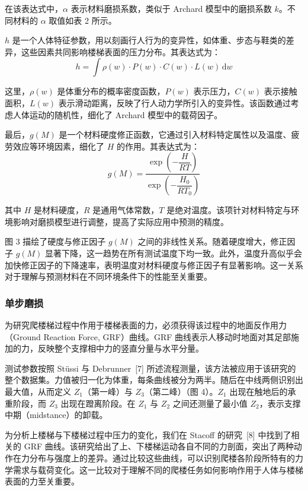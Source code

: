\documentclass[11pt,a4paper]{ctexart}
\begin{document}
在该表达式中，$\alpha$ 表示材料磨损系数，类似于 Archard 模型中的磨损系数 $k$。不同材料的 $\alpha$ 取值如表 2 所示。

$h$ 是一个人体特征参数，用以刻画行人行为的变异性，如体重、步态与鞋类的差异，这些因素共同影响楼梯表面的压力分布。其表达式为：
\begin{equation}
h = \int \rho(w)\cdot P(w)\cdot C(w)\cdot L(w)\,\mathrm{d}w
\end{equation}

这里，$\rho(w)$ 是体重分布的概率密度函数，$P(w)$ 表示压力，$C(w)$ 表示接触面积，$L(w)$ 表示滑动距离，反映了行人动力学所引入的变异性。该函数通过考虑人体运动的随机性，细化了 Archard 模型中的载荷因子。

最后，$g(M)$ 是一个材料硬度修正函数，它通过引入材料特定属性以及温度、疲劳效应等环境因素，细化了 $H$ 的作用。其表达式为：
\begin{equation}
g(M) = \frac{\exp\left(-\dfrac{H}{RT}\right)}{\exp\left(-\dfrac{H_0}{RT_0}\right)}
\end{equation}

其中 $H$ 是材料硬度，$R$ 是通用气体常数，$T$ 是绝对温度。该项针对材料特定与环境影响对磨损模型进行调整，提高了实际应用中预测的精度。

图 3 描绘了硬度与修正因子 $g(M)$ 之间的非线性关系。随着硬度增大，修正因子 $g(M)$ 显著下降，这一趋势在所有测试温度下均一致。此外，温度升高似乎会加快修正因子的下降速率，表明温度对材料硬度与修正因子有显著影响。这一关系对于理解与预测材料在不同环境条件下的性能至关重要。

\subsubsection{单步磨损}

为研究爬楼梯过程中作用于楼梯表面的力，必须获得该过程中的地面反作用力（Ground Reaction Force, GRF）曲线。GRF 曲线表示人移动时地面对其足部施加的力，反映整个支撑相中力的竖直分量与水平分量。

测试参数按照 Stüssi 与 Debrunner~[7] 所述流程测量，该方法被应用于该研究的整个数据集。力值被归一化为体重，每条曲线被分为两半。随后在中线两侧识别出最大值，从而定义 $Z_1$（第一峰）与 $Z_3$（第二峰）（图 4）。$Z_1$ 出现在触地后的承重阶段，而 $Z_3$ 出现在蹬离阶段。在 $Z_1$ 与 $Z_2$ 之间还测量了最小值 $Z_2$，表示支撑中期（midstance）的卸载。

为分析上楼梯与下楼梯过程中压力的变化，我们在 Stacoff 的研究~[8] 中找到了相关的 GRF 曲线。该研究给出了上、下楼梯运动各自不同的力剖面，突出了两种动作在力分布与强度上的差异。通过比较这些曲线，可以识别爬楼各阶段所特有的力学需求与载荷变化。这一比较对于理解不同的爬楼任务如何影响作用于人体与楼梯表面的力至关重要。
\end{document}
